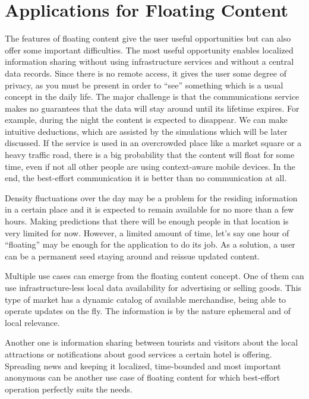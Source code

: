 \section{Applications for Floating Content}

The features of floating content give the user useful opportunities but can also
offer some important difficulties. The most useful opportunity enables
localized information sharing without using infrastructure services and without
a central data records. Since there is no remote access, it gives the user some
degree of privacy, as you must be present in order to ``see'' something which is
a usual concept in the daily life. The major challenge is that the
communications service makes no guarantees that the data will stay around until
its lifetime expires. For example, during the night the content is expected
to disappear. We can make intuitive deductions, which are assisted by the
simulations which will be later discussed. If the service is used in an
overcrowded place like a market square or a heavy traffic road, there is a big
probability that the content will float for some time, even if not all other
people are using context-aware mobile devices. In the end, the best-effort
communication it is better than no communication at all.

Density fluctuations over the day may be a problem for the residing information
in a certain place and it is expected to remain available for no more than a few
hours. Making predictions that there will be enough people in that location is
very limited for now. However, a limited amount of time, let's say one hour of
``floating'' may be enough for the application to do its job. As a solution, a
user can be a permanent seed staying around and reissue updated content.

Multiple use cases can emerge from the floating content concept. One of them can
use infrastructure-less local data availability for advertising or selling
goods. This type of market has a dynamic catalog of available merchandise, being
able to operate updates on the fly. The information is by the nature ephemeral
and of local relevance.

Another one is information sharing between tourists and visitors about the local
attractions or notifications about good services a certain hotel is offering.
Spreading news and keeping it localized, time-bounded and most important
anonymous can be another use case of floating content for which best-effort
operation perfectly suits the needs.

